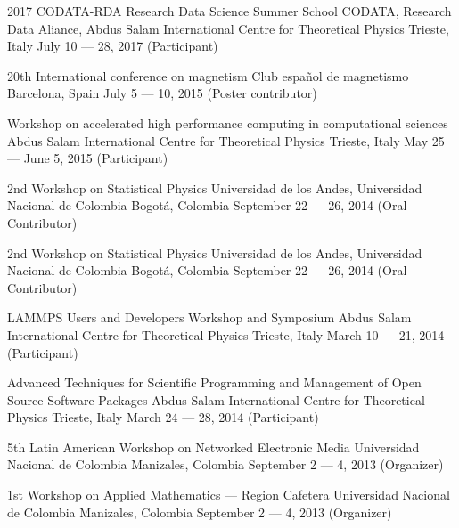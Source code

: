 \documentclass[12pt,english]{moderncv}
\begin{document}
        {2017 CODATA-RDA Research Data Science Summer School}
        {CODATA, Research Data Aliance, Abdus Salam International Centre for Theoretical Physics}
        {Trieste, Italy}
        {July 10 --- 28, 2017}
        {(Participant)}

        {20th International conference on magnetism}
        {Club español de magnetismo}
        {Barcelona, Spain}
        {July 5 --- 10, 2015}
        {(Poster contributor)}

        {Workshop on accelerated high performance computing in computational sciences}
        {Abdus Salam International Centre for Theoretical Physics}
        {Trieste, Italy}
        {May 25 --- June 5, 2015}
        {(Participant)}

        {2nd Workshop on Statistical Physics}
        {Universidad de los Andes, Universidad Nacional de Colombia}
        {Bogotá, Colombia}
        {September 22 --- 26, 2014}
        {(Oral Contributor)}

        {2nd Workshop on Statistical Physics}
        {Universidad de los Andes, Universidad Nacional de Colombia}
        {Bogotá, Colombia}
        {September 22 --- 26, 2014}
        {(Oral Contributor)}

        {LAMMPS Users and Developers Workshop and Symposium}
        {Abdus Salam International Centre for Theoretical Physics}
        {Trieste, Italy}
        {March 10 --- 21, 2014}
        {(Participant)}

        {%
            Advanced Techniques for Scientific Programming and Management
            of Open Source Software Packages
        }
        {Abdus Salam International Centre for Theoretical Physics}
        {Trieste, Italy}
        {March 24 --- 28, 2014}
        {(Participant)}

        {5th Latin American Workshop on Networked Electronic Media}
        {Universidad Nacional de Colombia}
        {Manizales, Colombia}
        {September 2 --- 4, 2013}
        {(Organizer)}


        {1st Workshop on Applied Mathematics --- Region Cafetera}
        {Universidad Nacional de Colombia}
        {Manizales, Colombia}
        {September 2 --- 4, 2013}
        {(Organizer)}
\end{document}
